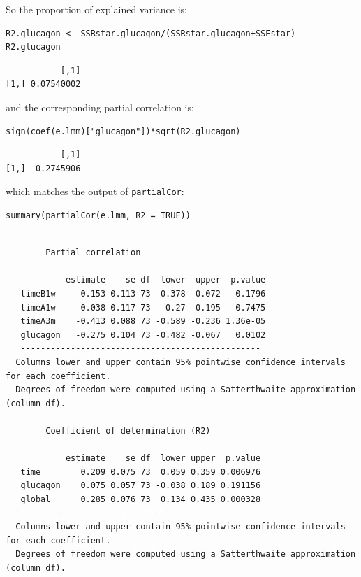 \documentclass[12pt]{article}
\begin{document}
So the proportion of explained variance is:
\lstset{language=r,label= ,caption= ,captionpos=b,numbers=none}
\begin{lstlisting}
R2.glucagon <- SSRstar.glucagon/(SSRstar.glucagon+SSEstar)
R2.glucagon
\end{lstlisting}

\begin{verbatim}
           [,1]
[1,] 0.07540002
\end{verbatim}


and the corresponding partial correlation is:
\lstset{language=r,label= ,caption= ,captionpos=b,numbers=none}
\begin{lstlisting}
sign(coef(e.lmm)["glucagon"])*sqrt(R2.glucagon)
\end{lstlisting}

\begin{verbatim}
           [,1]
[1,] -0.2745906
\end{verbatim}


which matches the output of \texttt{partialCor}:
\lstset{language=r,label= ,caption= ,captionpos=b,numbers=none}
\begin{lstlisting}
summary(partialCor(e.lmm, R2 = TRUE))
\end{lstlisting}

\begin{verbatim}

		Partial correlation 

            estimate    se df  lower  upper  p.value
   timeB1w    -0.153 0.113 73 -0.378  0.072   0.1796
   timeA1w    -0.038 0.117 73  -0.27  0.195   0.7475
   timeA3m    -0.413 0.088 73 -0.589 -0.236 1.36e-05
   glucagon   -0.275 0.104 73 -0.482 -0.067   0.0102
   ------------------------------------------------ 
  Columns lower and upper contain 95% pointwise confidence intervals for each coefficient.
  Degrees of freedom were computed using a Satterthwaite approximation (column df). 

		Coefficient of determination (R2)

            estimate    se df  lower upper  p.value
   time        0.209 0.075 73  0.059 0.359 0.006976
   glucagon    0.075 0.057 73 -0.038 0.189 0.191156
   global      0.285 0.076 73  0.134 0.435 0.000328
   ------------------------------------------------ 
  Columns lower and upper contain 95% pointwise confidence intervals for each coefficient.
  Degrees of freedom were computed using a Satterthwaite approximation (column df).
\end{verbatim}
\end{document}
